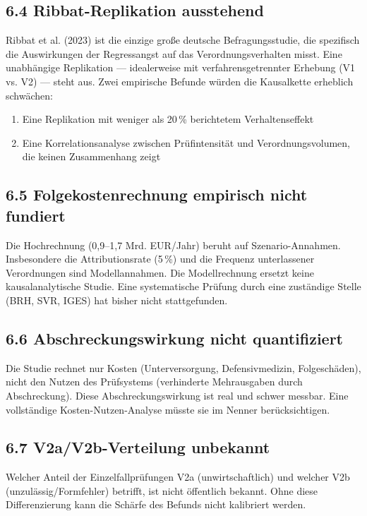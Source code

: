 \documentclass{umbruch-position}
\begin{document}
\subsection*{6.4 Ribbat-Replikation ausstehend}

Ribbat et al. (2023) ist die einzige gro\ss{}e deutsche Befragungsstudie, die spezifisch die Auswirkungen der Regressangst auf das Verordnungsverhalten misst. Eine unabh\"angige Replikation --- idealerweise mit verfahrensgetrennter Erhebung (V1 vs. V2) --- steht aus. Zwei empirische Befunde w\"urden die Kausalkette erheblich schw\"achen:

\begin{enumerate}
  \item Eine Replikation mit weniger als 20\,\% berichtetem Verhaltenseffekt
  \item Eine Korrelationsanalyse zwischen Pr\"ufintensit\"at und Verordnungsvolumen, die keinen Zusammenhang zeigt
\end{enumerate}

\subsection*{6.5 Folgekostenrechnung empirisch nicht fundiert}

Die Hochrechnung (0,9--1,7 Mrd. EUR/Jahr) beruht auf Szenario-Annahmen. Insbesondere die Attributionsrate (5\,\%) und die Frequenz unterlassener Verordnungen sind Modellannahmen. Die Modellrechnung ersetzt keine kausalanalytische Studie. Eine systematische Pr\"ufung durch eine zust\"andige Stelle (BRH, SVR, IGES) hat bisher nicht stattgefunden.

\subsection*{6.6 Abschreckungswirkung nicht quantifiziert}

Die Studie rechnet nur Kosten (Unterversorgung, Defensivmedizin, Folgesch\"aden), nicht den Nutzen des Pr\"ufsystems (verhinderte Mehrausgaben durch Abschreckung). Diese Abschreckungswirkung ist real und schwer messbar. Eine vollst\"andige Kosten-Nutzen-Analyse m\"usste sie im Nenner ber\"ucksichtigen.

\subsection*{6.7 V2a/V2b-Verteilung unbekannt}

Welcher Anteil der Einzelfallpr\"ufungen V2a (unwirtschaftlich) und welcher V2b (unzul\"assig/Formfehler) betrifft, ist nicht \"offentlich bekannt. Ohne diese Differenzierung kann die Sch\"arfe des Befunds nicht kalibriert werden.
\end{document}
